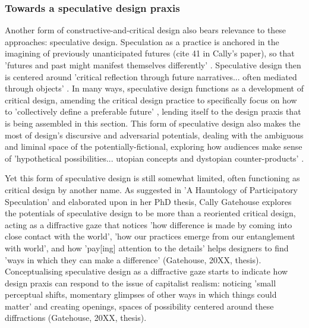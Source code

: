 \subsubsection{Towards a speculative design praxis}

Another form of constructive-and-critical design also bears relevance to these approaches: speculative design. Speculation as a practice is anchored in the imagining of previously unanticipated futures (cite 41 in Cally's paper), so that 'futures and past might manifest themselves differently' \cite{gatehouse_hauntology_2020}. Speculative design then is centered around 'critical reflection through future narratives... often mediated through objects' \cite{forlano_ethnographies_2013}. In many ways, speculative design functions as a development of critical design, amending the critical design practice to specifically focus on how to 'collectively define a preferable future' \cite{dunne_speculative_2013, 6}, lending itself to the design praxis that is being assembled in this section. This form of speculative design also makes the most of design's discursive and adversarial potentials, dealing with the ambiguous and liminal space of the potentially-fictional, exploring how audiences make sense of 'hypothetical possibilities... utopian concepts and dystopian counter-products' \cite{auger_speculative_2013}.

Yet this form of speculative design is still somewhat limited, often functioning as critical design by another name. As suggested in 'A Hauntology of Participatory Speculation' and elaborated upon in her PhD thesis, Cally Gatehouse explores the potentials of speculative design to be more than a reoriented critical design, acting as a diffractive gaze that notices 'how difference is made by coming into close contact with the world', 'how our practices emerge from our entanglement with world', and how 'pay[ing] attention to the details' helps designers to find 'ways in which they can make a difference' (Gatehouse, 20XX, thesis). Conceptualising speculative design as a diffractive gaze starts to indicate how design praxis can respond to the issue of capitalist realism: noticing 'small perceptual shifts, momentary glimpses of other ways in which things could matter' and creating openings, spaces of possibility centered around these diffractions (Gatehouse, 20XX, thesis). 


